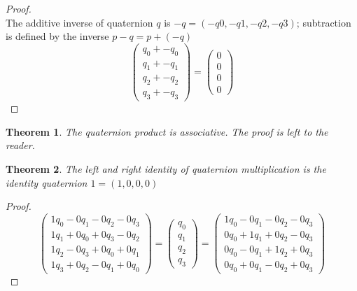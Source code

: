\documentclass{amsart}
\newtheorem{theorem}{Theorem}[section]
\theoremstyle{definition}
\theoremstyle{remark}
\numberwithin{equation}{section}
\begin{document}
\begin{proof}
\begin{equation}
  \end{equation}
  The additive inverse of quaternion $q$ is $-q=(-q0, -q1, -q2, -q3)$; subtraction is defined by the inverse $p-q = p+ (-q)$
  \begin{equation}
    \begin{pmatrix}
      q_0 + -q_0 \\
      q_1 + -q_1 \\
      q_2 + -q_2 \\
      q_3 + -q_3
    \end{pmatrix} =
    \begin{pmatrix}
      0 \\
      0 \\
      0 \\
      0
    \end{pmatrix}
  \end{equation}
\end{proof}

\begin{theorem}
  The quaternion product is associative. The proof is left to the reader.
\end{theorem}
\begin{theorem}
  The left and right identity of quaternion multiplication is the \emph{identity quaternion} $1=(1,0,0,0)$
\end{theorem}
\begin{proof}
  \begin{equation}
    \begin{pmatrix}
      1q_0 - 0q_1 - 0q_2 - 0q_3 \\
      1q_1 + 0q_0 + 0q_3 - 0q_2 \\
      1q_2 - 0q_3 + 0q_0 + 0q_1 \\
      1q_3 + 0q_2 - 0q_1 + 0q_0
    \end{pmatrix} =
    \begin{pmatrix}
      q_0 \\
      q_1 \\
      q_2 \\
      q_3
    \end{pmatrix} =  
    \begin{pmatrix}
      1q_0 - 0q_1 - 0q_2 - 0q_3 \\
      0q_0 + 1q_1 + 0q_2 - 0q_3 \\
      0q_0 - 0q_1 + 1q_2 + 0q_3 \\
      0q_0 + 0q_1 - 0q_2 + 0q_3
    \end{pmatrix}
  \end{equation}
\end{proof}
\end{document}
